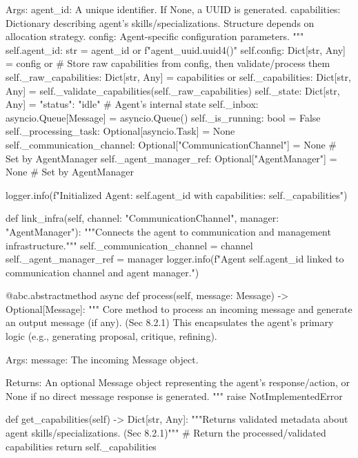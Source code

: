 \documentclass{amsbook}
\theoremstyle{definition}
\theoremstyle{remark}
\numberwithin{equation}{chapter} %
\begin{document}
\begin{python}
        Args:
            agent_id: A unique identifier. If None, a UUID is generated.
            capabilities: Dictionary describing agent's skills/specializations. Structure depends on allocation strategy.
            config: Agent-specific configuration parameters.
        """
        self.agent_id: str = agent_id or f"agent_{uuid.uuid4()}"
        self.config: Dict[str, Any] = config or {}
        # Store raw capabilities from config, then validate/process them
        self._raw_capabilities: Dict[str, Any] = capabilities or {}
        self._capabilities: Dict[str, Any] = self._validate_capabilities(self._raw_capabilities)
        self._state: Dict[str, Any] = {"status": "idle"} # Agent's internal state
        self._inbox: asyncio.Queue[Message] = asyncio.Queue()
        self._is_running: bool = False
        self._processing_task: Optional[asyncio.Task] = None
        self._communication_channel: Optional["CommunicationChannel"] = None # Set by AgentManager
        self._agent_manager_ref: Optional["AgentManager"] = None # Set by AgentManager

        logger.info(f"Initialized Agent: {self.agent_id} with capabilities: {self._capabilities}")

    def link_infra(self, channel: "CommunicationChannel", manager: "AgentManager"):
        """Connects the agent to communication and management infrastructure."""
        self._communication_channel = channel
        self._agent_manager_ref = manager
        logger.info(f"Agent {self.agent_id} linked to communication channel and agent manager.")

    @abc.abstractmethod
    async def process(self, message: Message) -> Optional[Message]:
        """
        Core method to process an incoming message and generate an output message (if any). (Sec 8.2.1)
        This encapsulates the agent's primary logic (e.g., generating proposal, critique, refining).

        Args:
            message: The incoming Message object.

        Returns:
            An optional Message object representing the agent's response/action,
            or None if no direct message response is generated.
        """
        raise NotImplementedError

    def get_capabilities(self) -> Dict[str, Any]:
        """Returns validated metadata about agent skills/specializations. (Sec 8.2.1)"""
        # Return the processed/validated capabilities
        return self._capabilities


\end{python}
\end{document}
